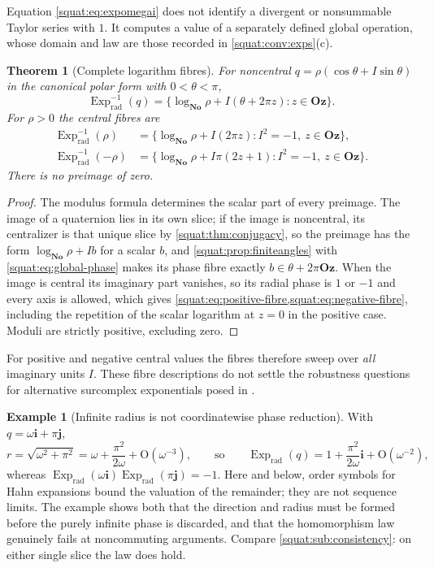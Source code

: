 \documentclass[11pt,letterpaper]{article}
\numberwithin{equation}{section}
\newtheorem{theorem}{Theorem}[section]
\theoremstyle{definition}
\newtheorem{example}[example]{Example}
\theoremstyle{remark}
\newcommand{\No}{\mathbf{No}}
\newcommand{\Oz}{\mathbf{Oz}}
\newcommand{\ii}{\mathbf i}
\newcommand{\jj}{\mathbf j}
\newcommand{\Exp}{\operatorname{Exp}}
\newcommand{\Expr}{\Exp_{\mathrm{rad}}}
\begin{document}
Equation \cref{squat:eq:expomegai} does not identify a divergent or nonsummable Taylor
series with $1$. It computes a value of a separately defined global operation, whose
domain and law are those recorded in \cref{squat:conv:exps}(c).

\begin{theorem}[Complete logarithm fibres]\label{squat:thm:logfibres}
For noncentral $q=\rho(\cos\theta+I\sin\theta)$ in the canonical polar form with
$0<\theta<\pi$,
\begin{equation}\label{squat:eq:logfibre-nonreal}
 \Expr^{-1}(q)=\{\log_{\No}\rho+I(\theta+2\pi z):z\in\Oz\} .
\end{equation}
For $\rho>0$ the central fibres are
\begin{align}
 \Expr^{-1}(\rho)&=\{\log_{\No}\rho+I(2\pi z):I^2=-1,\ z\in\Oz\},
 \label{squat:eq:positive-fibre}\\
 \Expr^{-1}(-\rho)&=\{\log_{\No}\rho+I\pi(2z+1):I^2=-1,\ z\in\Oz\}.
 \label{squat:eq:negative-fibre}
\end{align}
There is no preimage of zero.
\end{theorem}
\begin{proof}
The modulus formula determines the scalar part of every preimage. The image of a
quaternion lies in its own slice; if the image is noncentral, its centralizer is that
unique slice by \cref{squat:thm:conjugacy}, so the preimage has the form
$\log_{\No}\rho+Ib$ for a scalar $b$, and \cref{squat:prop:finiteangles} with
\cref{squat:eq:global-phase} makes its phase fibre exactly $b\in\theta+2\pi\Oz$. When the
image is central its imaginary part vanishes, so its radial phase is $1$ or $-1$ and every
axis is allowed, which gives \cref{squat:eq:positive-fibre,squat:eq:negative-fibre},
including the repetition of the scalar logarithm at $z=0$ in the positive case. Moduli are
strictly positive, excluding zero.
\end{proof}

For positive and negative central values the fibres therefore sweep over \emph{all}
imaginary units $I$. These fibre descriptions do not settle the robustness questions for
alternative surcomplex exponentials posed in \cite{EK}.

\begin{example}[Infinite radius is not coordinatewise phase reduction]
\label{squat:ex:radialnotproduct}
With $q=\omega\ii+\pi\jj$,
\[
 r=\sqrt{\omega^2+\pi^2}=\omega+\frac{\pi^2}{2\omega}+\mathrm O(\omega^{-3}),
 \qquad\text{so}\qquad
 \Expr(q)=1+\frac{\pi^2}{2\omega}\ii+\mathrm O(\omega^{-2}),
\]
whereas $\Expr(\omega\ii)\Expr(\pi\jj)=-1$. Here and below, order symbols for Hahn
expansions bound the valuation of the remainder; they are not sequence limits. The example
shows both that the direction and radius must be formed before the purely infinite phase is
discarded, and that the homomorphism law genuinely fails at noncommuting arguments.
Compare \cref{squat:sub:consistency}: on either single slice the law does hold.
\end{example}
\end{document}
